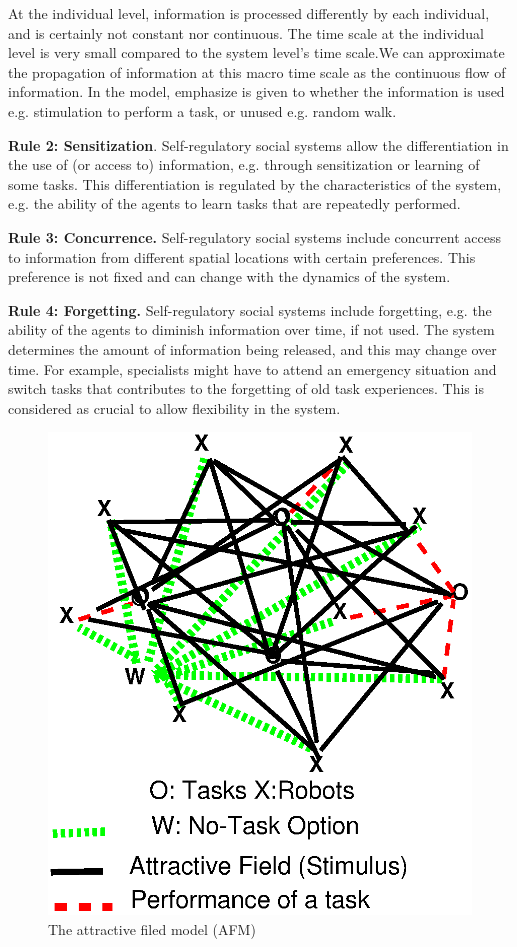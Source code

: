 \documentclass[final,5p,times,twocolumn]{elsarticle}
\begin{document}
At the individual level, information is processed differently by each individual, and is certainly not constant nor continuous. The time scale at the individual level is very small compared to the system level's time scale.We can approximate the propagation of information at this macro time scale as the continuous flow of information.  In the model, emphasize is given to whether the information is used e.g. stimulation to perform a task, or unused e.g. random walk.

\textbf{Rule 2: Sensitization}. Self-regulatory social systems allow the differentiation in the use of  (or access to) information, e.g. through sensitization or learning of some tasks. This differentiation is regulated by the characteristics of the system, e.g. the ability of the agents to learn tasks that are repeatedly performed.

\textbf{Rule 3: Concurrence.} Self-regulatory social systems include concurrent access to information from different spatial locations with certain preferences. This preference is not fixed and can change with the dynamics of the system. 

\textbf{Rule 4: Forgetting.} Self-regulatory social systems include forgetting, e.g. the ability of the agents to diminish information over time, if not used. The system determines the amount of information being released, and this may change over time. For example, specialists might have to attend an emergency situation and switch tasks that contributes to the forgetting of old task experiences. This is considered as crucial to allow flexibility in the system.
\begin{figure}
\centering
\includegraphics[width=0.7\linewidth, angle=0]{./images/AFM-Diag2.eps}
\caption{The attractive filed model (AFM)}
\label{fig:afm} %
\end{figure}
\end{document}
